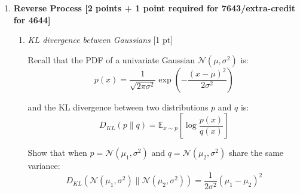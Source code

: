 \documentclass[11pt,english]{article}
\begin{document}
\begin{enumerate}
\begin{enumerate}
        \item \textit{Closed form of $q(x_t|x_0)$} [2 pt]
        
        Prove the expression above for $q(x_t|x_0)$ is true for all $t\geq 1$ by induction on $t$. 
        
        \textbf{Helpful identities:}
        \begin{itemize}
            \item \textit{Reparametrization trick}: A random variable $X \sim \mathcal{N}(\mu, \sigma^2 I)$ can be written as $X = \mu + \sigma \epsilon$ where $\epsilon \sim \mathcal{N}(0, I)$.
            \item \textit{Sum of independent Gaussians}: If $X \sim \mathcal{N}(0, I)$ and $Y \sim \mathcal{N}(0, I)$ are independent, then $aX + bY \sim \mathcal{N}(0, (a^2 + b^2)I)$, or equivalently $aX + bY = \sqrt{a^2 + b^2}\,\epsilon$ where $\epsilon \sim \mathcal{N}(0, I)$.
        \end{itemize}
        
        \item \textit{Noise distribution $q(x_T|x_0)$} [1 pt]
        
        In diffusion models, we choose $\{\beta_t\}$ such that $\bar\alpha_T \approx 0$. What is $q(x_T|x_0)$ when $\bar\alpha_T = 0$? Why is this useful for generation?
    \end{enumerate}


\item \textbf{Reverse Process [2 points + 1 point required for 7643/extra-credit for 4644]}    
    \begin{enumerate}
    
        \item \textit{KL divergence between Gaussians} [1 pt]
        
        Recall that the PDF of a univariate Gaussian $\mathcal{N}(\mu, \sigma^2)$ is:
        \[p(x) = \frac{1}{\sqrt{2\pi\sigma^2}} \exp\left(-\frac{(x - \mu)^2}{2\sigma^2}\right)\]
        
        and the KL divergence between two distributions $p$ and $q$ is:
        \[D_{KL}(p \| q) = \mathbb{E}_{x \sim p}\left[\log \frac{p(x)}{q(x)}\right]\]
        
        Show that when $p = \mathcal{N}(\mu_1, \sigma^2)$ and $q = \mathcal{N}(\mu_2, \sigma^2)$ share the same variance:
        \[D_{KL}(\mathcal{N}(\mu_1, \sigma^2) \| \mathcal{N}(\mu_2, \sigma^2)) = \frac{1}{2\sigma^2}(\mu_1 - \mu_2)^2\]


\end{enumerate}
\end{enumerate}
\end{document}
